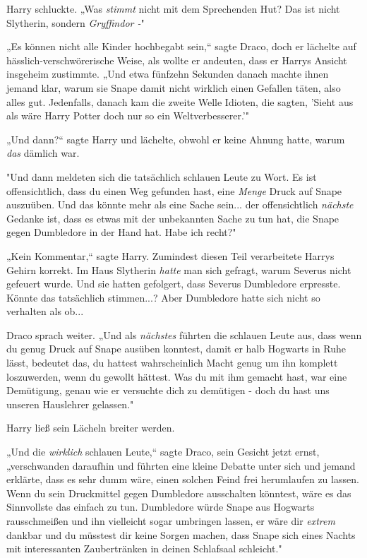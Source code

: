 {Harry schluckte. „Was \emph{stimmt} nicht mit dem Sprechenden Hut? Das ist nicht Slytherin, sondern \emph{Gryffindor -}"

„Es können nicht alle Kinder hochbegabt sein,“ sagte Draco, doch er lächelte auf hässlich-verschwörerische Weise, als wollte er andeuten, dass er Harrys Ansicht insgeheim zustimmte. „Und etwa fünfzehn Sekunden danach machte ihnen jemand klar, warum sie Snape damit nicht wirklich einen Gefallen täten, also alles gut. Jedenfalls, danach kam die zweite Welle Idioten, die sagten, 'Sieht aus als wäre Harry Potter doch nur so ein Weltverbesserer.'"

„Und dann?“ sagte Harry und lächelte, obwohl er keine Ahnung hatte, warum \emph{das} dämlich war.

"Und dann meldeten sich die tatsächlich schlauen Leute zu Wort. Es ist offensichtlich, dass du einen Weg gefunden hast, eine \emph{Menge} Druck auf Snape auszuüben. Und das könnte mehr als eine Sache sein... der offensichtlich \emph{nächste} Gedanke ist, dass es etwas mit der unbekannten Sache zu tun hat, die Snape gegen Dumbledore in der Hand hat. Habe ich recht?"

„Kein Kommentar,“ sagte Harry. Zumindest diesen Teil verarbeitete Harrys Gehirn korrekt. Im Haus Slytherin \emph{hatte} man sich gefragt, warum Severus nicht gefeuert wurde. Und sie hatten gefolgert, dass Severus Dumbledore erpresste. Könnte das tatsächlich stimmen...? Aber Dumbledore hatte sich nicht so verhalten als ob...

Draco sprach weiter. „Und als \emph{nächstes} führten die schlauen Leute aus, dass wenn du genug Druck auf Snape ausüben konntest, damit er halb Hogwarts in Ruhe lässt, bedeutet das, du hattest wahrscheinlich Macht genug um ihn komplett loszuwerden, wenn du gewollt hättest. Was du mit ihm gemacht hast, war eine Demütigung, genau wie er versuchte dich zu demütigen - doch du hast uns unseren Hauslehrer gelassen."

Harry ließ sein Lächeln breiter werden.

„Und die \emph{wirklich} schlauen Leute,“ sagte Draco, sein Gesicht jetzt ernst, „verschwanden daraufhin und führten eine kleine Debatte unter sich und jemand erklärte, dass es sehr dumm wäre, einen solchen Feind frei herumlaufen zu lassen. Wenn du sein Druckmittel gegen Dumbledore ausschalten könntest, wäre es das Sinnvollste das einfach zu tun. Dumbledore würde Snape aus Hogwarts rausschmeißen und ihn vielleicht sogar umbringen lassen, er wäre dir \emph{extrem} dankbar und du müsstest dir keine Sorgen machen, dass Snape sich eines Nachts mit interessanten Zaubertränken in deinen Schlafsaal schleicht."

}
